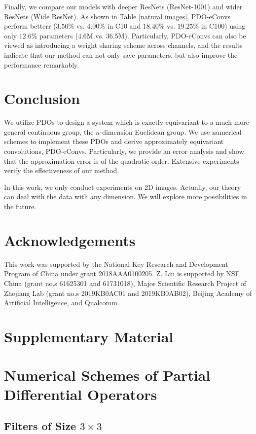 \documentclass{article}
\begin{document}
Finally, we compare our models with deeper ResNets (ResNet-1001) and wider ResNets (Wide ResNet). As shown in Table \ref{natural images}, PDO-eConvs perform betterr ($3.50\%$ vs. $4.00\%$  in C10 and $18.40\%$ vs. $19.25\%$ in C100) using only $12.6\%$ parameters (4.6M vs. 36.5M). Particularly, PDO-eConvs can also be viewed as introducing a weight sharing scheme across channels, and the results indicate that our method can not only save parameters, but also improve the performance remarkably.

\section{Conclusion}

We utilize PDOs to design a system which is exactly equivariant to a much more general continuous group, the $n$-dimension Euclidean group. We use numerical schemes to implement these PDOs and derive approximately equivariant convolutions, PDO-eConvs. Particularly, we provide an error analysis and show that the approximation error is of the quadratic order. Extensive experiments verify the effectiveness of our method.

In this work, we only conduct experiments on 2D images. Actually, our theory can deal with the data with any dimension. We will explore more possibilities in the future.

\section*{Acknowledgements}
This work was supported by the National Key Research and Development Program of China under grant 2018AAA0100205. Z. Lin is supported by NSF China (grant no.s 61625301 and 61731018), Major Scientific Research Project of Zhejiang Lab (grant no.s 2019KB0AC01 and 2019KB0AB02), Beijing Academy of Artificial Intelligence, and Qualcomm.





\appendix
\section*{Supplementary Material}
\section{Numerical Schemes of Partial Differential Operators}
\subsection{Filters of Size $3\times 3$}
\end{document}
